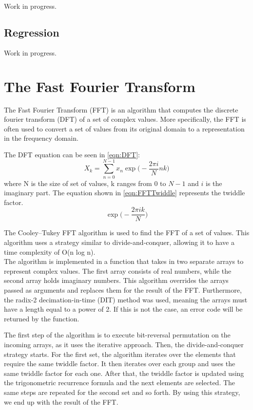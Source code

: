 \documentclass{book}
\begin{document}
Work in progress.
\subsection{Regression}

Work in progress.

\section{The Fast Fourier Transform}


The Fast Fourier Transform (FFT) is an algorithm that computes the discrete fourier transform (DFT) of a set of complex values. More specifically, the FFT is often used to convert a set of values from its original domain to a representation in the frequency domain.

The DFT equation can be seen in \ref{eqn:DFT}:
\begin{equation}
	X_k = \sum_{n=0}^{N-1} x_n \exp \biggl(- \frac{2 \pi i}{N} nk \biggr)
	\label{eqn:DFT}
\end{equation}
where N is the size of set of values, k ranges from 0 to $N-1$ and $i$ is the imaginary part. The equation shown in \ref{eqn:FFTTwiddle} represents the twiddle factor.
\begin{equation}
	\exp \biggl( - \frac{2 \pi i k}{N} \biggr)
	\label{eqn:FFTTwiddle}
\end{equation}

The Cooley–Tukey FFT algorithm is used to find the FFT of a set of values. This algorithm uses a strategy similar to divide-and-conquer, allowing it to have a time complexity of O(n log n). \\

The algorithm is implemented in a function that takes in two separate arrays to represent complex values. The first array consists of real numbers, while the second array holds imaginary numbers. This algorithm overrides the arrays passed as arguments and replaces them for the result of the FFT. Furthermore, the radix-2 decimation-in-time (DIT) method was used, meaning the arrays must have a length equal to a power of 2. If this is not the case, an error code will be returned by the function. 

The first step of the algorithm is to execute bit-reversal permutation on the incoming arrays, as it uses the iterative approach. Then, the divide-and-conquer strategy starts. For the first set, the algorithm iterates over the elements that require the same twiddle factor. It then iterates over each group and uses the same twiddle factor for each one. After that, the twiddle factor is updated using the trigonometric recurrence formula and the next elements are selected. The same steps are repeated for the second set and so forth. By using this strategy, we end up with the result of the FFT.\\
\end{document}
